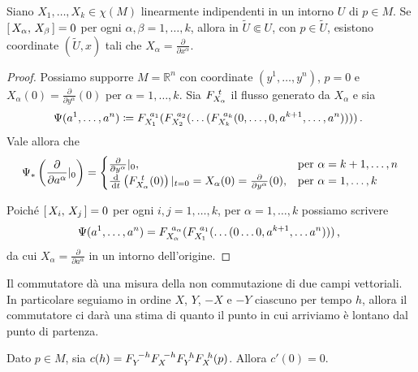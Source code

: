 \begin{proposition} \label{prop:ParentesiZeroImplicaCoordinateLocali}
	Siano $X_1,\dots ,X_k\in \chi(M)$ linearmente indipendenti in un intorno $U$ di $p\in M$. Se $\left[\,X_\alpha,\,X_\beta\,\right]=0$ per ogni $\alpha,\beta=1,\ldots ,k$, allora in $\tilde{U}\Subset U$, con $p\in \tilde{U}$, esistono coordinate $(\tilde{U},x)$ tali che $X_\alpha=\frac{\partial}{\partial x^{\alpha}}$.
\end{proposition}

\begin{proof} %
	Possiamo supporre $M=\mathbb{R}^n$ con coordinate $(y^1,\dots, y^n)$, $p=0$ e $X_\alpha(0)=\frac{\partial}{\partial y^\alpha}(0)$ per $\alpha=1,\dots, k$. Sia $F_{X_\alpha}^{\ t}$ il flusso generato da $X_\alpha$ e sia 
	\begin{equation*}
		\Psi(a^1,\dots, a^n)\coloneqq F_{X_1}^{\ a_1}(F_{X_2}^{\ a_2}(\dots (F_{X_k}^{\ a_k}(0,\dots,0,a^{k+1},\dots, a^n))))\, \text{. } 
	\end{equation*}
	Vale allora che
	\begin{equation*}
		\Psi_*\left(\frac{\partial}{\partial a^\alpha}|_{0}\right) = 
		\begin{cases}
			\frac{\partial}{\partial y^\alpha}|_{0}, &\text{per $\alpha=k+1,\dots,n$}\\
			\frac{\,\mathrm d}{\,\mathrm d t}\left(F_{X_\alpha}^{\ t}(0)\right)|_{t=0} = X_\alpha(0)=\frac{\partial}{\partial y^{\alpha}}(0), &\text{per $\alpha=1,\dots,k$}
		\end{cases}
	\end{equation*}
	
	Poiché $\left[\,X_i,\,X_j\,\right]=0$ per ogni $i,j=1,\dots,k$, per $\alpha=1,\dots, k$ possiamo scrivere
	\begin{equation*}
		\Psi(a^1,\dots,a^n)=F_{X_\alpha}^{\ a_\alpha}(F_{X_1}^{\ a_1}(\dots (0\dots 0, a^{k+1},\dots a^n)))\, \text{, }
	\end{equation*}
	da cui $X_{\alpha}=\frac{\partial}{\partial a^{\alpha}}$ in un intorno dell'origine.
\end{proof}

Il commutatore dà una misura della non commutazione di due campi vettoriali. In particolare seguiamo in ordine $X$, $Y$, $-X$ e $-Y$ ciascuno per tempo $h$, allora il commutatore ci darà una stima di quanto il punto in cui arriviamo è lontano dal punto di partenza.

\begin{proposition} \label{prop:DerivataComposizioneFlussi}
	Dato $p\in M$, sia $c(h)=F_{Y}^{\ -h}F_{X}^{\ -h}F_{Y}^{\ h}F_{X}^{\ h}(p)$. Allora $c'(0)=0$.
\end{proposition}

